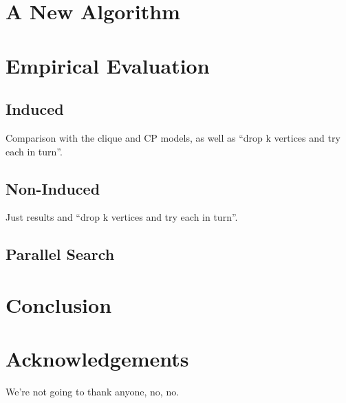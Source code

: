 \documentclass[letterpaper]{article}
\begin{document}
\section{A New Algorithm}

\section{Empirical Evaluation}

\subsection{Induced}

Comparison with the clique and CP models, as well as ``drop k vertices and try each in turn''.

\subsection{Non-Induced}

Just results and ``drop k vertices and try each in turn''.

\subsection{Parallel Search}

\section{Conclusion}

\section*{Acknowledgements}

We're not going to thank anyone, no, no.



\end{document}
